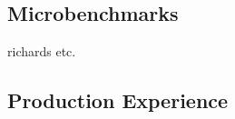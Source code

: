 \documentclass[english,cleveref,submission]{programming}
\begin{document}
\subsection{Microbenchmarks}

richards etc.



\subsection{Production Experience}



\end{document}
